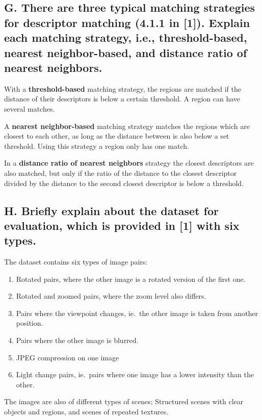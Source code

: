 \subsection{G. There are three typical matching strategies for descriptor
matching (4.1.1 in [1]). Explain each matching strategy, i.e., threshold-based,
nearest neighbor-based, and distance ratio of nearest neighbors.}

With a \textbf{threshold-based} matching strategy, the regions are matched if
the distance of their descriptors is below a certain threshold. A region can
have several matches.

A \textbf{nearest neighbor-based} matching strategy matches the regions which
are closest to each other, as long as the distance between is also below a set
threshold. Using this strategy a region only has one match.

In a \textbf{distance ratio of nearest neighbors} strategy the closest
descriptors are also matched, but only if the ratio of the distance to the
closest descriptor divided by the distance to the second closest descriptor is
below a threshold.

\subsection{H. Briefly explain about the dataset for evaluation, which is
provided in [1] with six types.}

The dataset contains six types of image pairs:
\begin{enumerate}

  \item Rotated pairs, where the other image is a rotated version of the first
    one.

  \item Rotated and zoomed pairs, where the zoom level also differs.

  \item Pairs where the viewpoint changes, ie.\ the other image is taken from
    another position.

  \item Pairs where the other image is blurred.

  \item JPEG compression on one image

  \item Light change pairs, ie.\ pairs where one image has a lower intensity
    than the other.

\end{enumerate}
The images are also of different types of scenes; Structured scenes with clear
objects and regions, and scenes of repeated textures.













